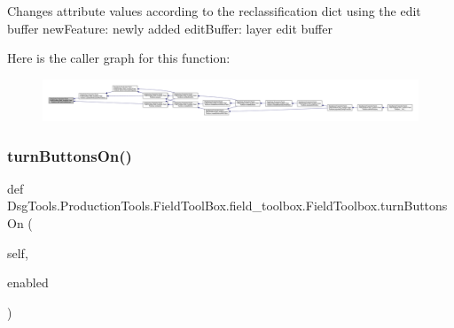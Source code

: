 \begin{DoxyVerb}Changes attribute values according to the reclassification dict using the edit buffer
newFeature: newly added
editBuffer: layer edit buffer
\end{DoxyVerb}
 Here is the caller graph for this function\+:
\nopagebreak
\begin{figure}[H]
\begin{center}
\leavevmode
\includegraphics[width=350pt]{class_dsg_tools_1_1_production_tools_1_1_field_tool_box_1_1field__toolbox_1_1_field_toolbox_a7ab94771efb094f3d331a9689c3af017_icgraph}
\end{center}
\end{figure}
\mbox{\label{class_dsg_tools_1_1_production_tools_1_1_field_tool_box_1_1field__toolbox_1_1_field_toolbox_af088d3efaf955572f22d8f3ac308a60f}} 
\subsubsection{\texorpdfstring{turn\+Buttons\+On()}{turnButtonsOn()}}
{\footnotesize\ttfamily def Dsg\+Tools.\+Production\+Tools.\+Field\+Tool\+Box.\+field\+\_\+toolbox.\+Field\+Toolbox.\+turn\+Buttons\+On (\begin{DoxyParamCaption}\item[{}]{self,  }\item[{}]{enabled }\end{DoxyParamCaption})}

